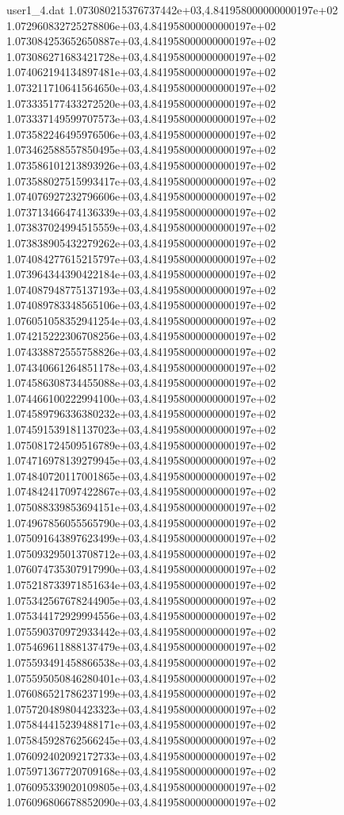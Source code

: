 \begin{filecontents}{user1_4.dat}
1.073080215376737442e+03,4.841958000000000197e+02
1.072960832725278806e+03,4.841958000000000197e+02
1.073084253652650887e+03,4.841958000000000197e+02
1.073086271683421728e+03,4.841958000000000197e+02
1.074062194134897481e+03,4.841958000000000197e+02
1.073211710641564650e+03,4.841958000000000197e+02
1.073335177433272520e+03,4.841958000000000197e+02
1.073337149599707573e+03,4.841958000000000197e+02
1.073582246495976506e+03,4.841958000000000197e+02
1.073462588557850495e+03,4.841958000000000197e+02
1.073586101213893926e+03,4.841958000000000197e+02
1.073588027515993417e+03,4.841958000000000197e+02
1.074076927232796606e+03,4.841958000000000197e+02
1.073713466474136339e+03,4.841958000000000197e+02
1.073837024994515559e+03,4.841958000000000197e+02
1.073838905432279262e+03,4.841958000000000197e+02
1.074084277615215797e+03,4.841958000000000197e+02
1.073964344390422184e+03,4.841958000000000197e+02
1.074087948775137193e+03,4.841958000000000197e+02
1.074089783348565106e+03,4.841958000000000197e+02
1.076051058352941254e+03,4.841958000000000197e+02
1.074215222306708256e+03,4.841958000000000197e+02
1.074338872555758826e+03,4.841958000000000197e+02
1.074340661264851178e+03,4.841958000000000197e+02
1.074586308734455088e+03,4.841958000000000197e+02
1.074466100222994100e+03,4.841958000000000197e+02
1.074589796336380232e+03,4.841958000000000197e+02
1.074591539181137023e+03,4.841958000000000197e+02
1.075081724509516789e+03,4.841958000000000197e+02
1.074716978139279945e+03,4.841958000000000197e+02
1.074840720117001865e+03,4.841958000000000197e+02
1.074842417097422867e+03,4.841958000000000197e+02
1.075088339853694151e+03,4.841958000000000197e+02
1.074967856055565790e+03,4.841958000000000197e+02
1.075091643897623499e+03,4.841958000000000197e+02
1.075093295013708712e+03,4.841958000000000197e+02
1.076074735307917990e+03,4.841958000000000197e+02
1.075218733971851634e+03,4.841958000000000197e+02
1.075342567678244905e+03,4.841958000000000197e+02
1.075344172929994556e+03,4.841958000000000197e+02
1.075590370972933442e+03,4.841958000000000197e+02
1.075469611888137479e+03,4.841958000000000197e+02
1.075593491458866538e+03,4.841958000000000197e+02
1.075595050846280401e+03,4.841958000000000197e+02
1.076086521786237199e+03,4.841958000000000197e+02
1.075720489804423323e+03,4.841958000000000197e+02
1.075844415239488171e+03,4.841958000000000197e+02
1.075845928762566245e+03,4.841958000000000197e+02
1.076092402092172733e+03,4.841958000000000197e+02
1.075971367720709168e+03,4.841958000000000197e+02
1.076095339020109805e+03,4.841958000000000197e+02
1.076096806678852090e+03,4.841958000000000197e+02

\end{filecontents}
